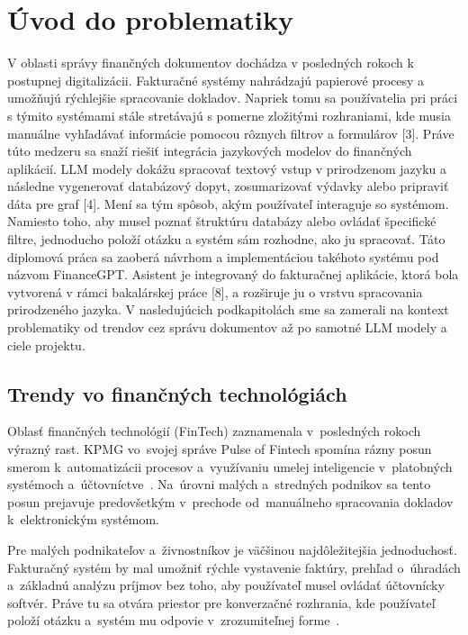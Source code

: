 \section{Úvod do problematiky}

V oblasti správy finančných dokumentov dochádza v posledných rokoch k postupnej digitalizácii.
Fakturačné systémy nahrádzajú papierové procesy a umožňujú rýchlejšie
spracovanie dokladov. Napriek tomu sa používatelia pri práci s týmito systémami stále
stretávajú s pomerne zložitými rozhraniami, kde musia manuálne vyhľadávať
informácie pomocou rôznych filtrov a formulárov [3]. Práve túto medzeru sa snaží riešiť
integrácia jazykových modelov do finančných aplikácií. LLM modely dokážu
spracovať textový vstup v prirodzenom jazyku a následne vygenerovať databázový
dopyt, zosumarizovať výdavky alebo pripraviť dáta pre graf [4]. Mení sa tým
spôsob, akým používateľ interaguje so systémom. Namiesto toho, aby musel poznať štruktúru
databázy alebo ovládať špecifické filtre, jednoducho položí otázku a systém sám
rozhodne, ako ju spracovať. Táto diplomová práca sa zaoberá návrhom a
implementáciou takéhoto systému pod názvom FinanceGPT. Asistent je integrovaný do
fakturačnej aplikácie, ktorá bola vytvorená v rámci bakalárskej práce [8], a rozširuje
ju o vrstvu spracovania prirodzeného jazyka. V nasledujúcich podkapitolách sme
sa zamerali na kontext problematiky od trendov cez správu dokumentov až po
samotné LLM modely a ciele projektu.

\subsection{Trendy vo finančných technológiách}

Oblasť finančných technológií (FinTech) zaznamenala v~posledných rokoch výrazný rast.
KPMG vo~svojej správe Pulse of Fintech spomína rázny posun smerom k~automatizácii
procesov a~využívaniu umelej inteligencie v~platobných systémoch a~účtovníctve~\cite{kpmg2021fintech}.
Na~úrovni malých a~stredných podnikov sa tento posun prejavuje predovšetkým v~prechode
od~manuálneho spracovania dokladov k~elektronickým systémom.

Pre malých podnikateľov a~živnostníkov je väčšinou najdôležitejšia jednoduchosť.
Fakturačný systém by mal umožniť rýchle vystavenie faktúry, prehľad o~úhradách a~základnú
analýzu príjmov bez toho, aby používateľ musel ovládať účtovnícky softvér. Práve tu
sa otvára priestor pre konverzačné rozhrania, kde používateľ položí otázku a~systém
mu odpovie v~zrozumiteľnej forme~\cite{atkinson2025}.

